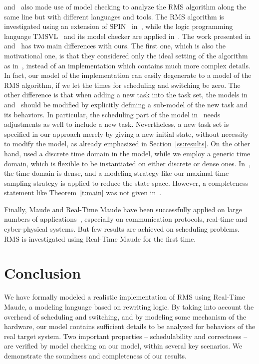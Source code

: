 \documentclass[12pt,onecolumn]{IEEEtranTIE}
\begin{document}
\cite{TianD2011} and~\cite{DBLP:conf/iceccs/CuiDT14} also made use of
model checking to analyze the RMS algorithm along the same line but
with different languages and tools. The RMS algorithm is investigated
using an extension of SPIN~\cite{DBLP:journals/tse/Holzmann97}
in~\cite{TianD2011}, while the logic programming language
TMSVL~\cite{DBLP:conf/icfem/HanDW12} and its model checker are applied
in~\cite{DBLP:conf/iceccs/CuiDT14}. The work presented
in~\cite{TianD2011} and~\cite{DBLP:conf/iceccs/CuiDT14} has two main
differences with ours. The first one, which is also the motivational
one, is that they considered only the ideal setting of the algorithm
as in~\cite{DBLP:journals/jacm/LiuL73}, instead of an implementation
which contains much more complex details. In fact, our model of the
implementation can easily degenerate to a model of the RMS algorithm,
if we let the times for scheduling and switching be zero. The other
difference is that when adding a new task into the task set, the
models in~\cite{TianD2011} and~\cite{DBLP:conf/iceccs/CuiDT14} should
be modified by explicitly defining a sub-model of the new task and its
behaviors. In particular, the scheduling part of the model
in~\cite{TianD2011} needs adjustments as well to include a new
task. Nevertheless, a new task set is specified in our approach merely
by giving a new initial state, without necessity to modify the model,
as already emphasized in Section~\ref{ss:results}. On the other hand,
\cite{TianD2011} used a discrete time domain in the model, while we
employ a generic time domain, which is flexible to be instantiated on
either discrete or dense ones. In~\cite{DBLP:conf/iceccs/CuiDT14}, the
time domain is dense, and a modeling strategy like our maximal time
sampling strategy is applied to reduce the state space. However, a
completeness statement like Theorem~\ref{t:main} was not given
in~\cite{DBLP:conf/iceccs/CuiDT14}.

Finally, Maude and Real-Time Maude have been successfully applied on
large numbers of applications~\cite{DBLP:journals/jlp/Meseguer12},
especially on communication protocols, real-time and cyber-physical
systems. But few results are achieved on scheduling problems. RMS is
investigated using Real-Time Maude for the first time.


\section{Conclusion}
\label{s:conclusion}
We have formally modeled a realistic implementation of RMS using
Real-Time Maude, a modeling language based on rewriting logic. By
taking into account the overhead of scheduling and switching, and by
modeling some mechanism of the hardware, our model contains sufficient
details to be analyzed for behaviors of the real target
system. Two important properties -- schedulability and correctness --
are verified by model checking on our model, within several key
scenarios. We demonstrate the soundness and completeness of our
results.
\end{document}
